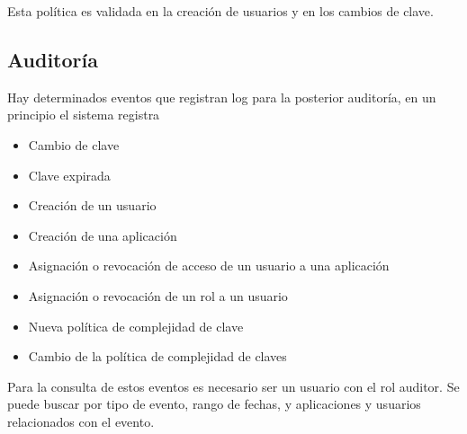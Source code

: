 Esta política es validada en la creación de usuarios y en los cambios de clave. 

\subsection{Auditoría}

Hay determinados eventos que registran log para la posterior auditoría, en un principio el sistema registra

\begin{itemize}
  \item Cambio de clave
  \item Clave expirada
  \item Creación de un usuario
  \item Creación de una aplicación
  \item Asignación o revocación de acceso de un usuario a una aplicación
  \item Asignación o revocación de un rol a un usuario
  \item Nueva política de complejidad de clave
  \item Cambio de la política de complejidad de claves
\end{itemize}

Para la consulta de estos eventos es necesario ser un usuario con el rol auditor.
Se puede buscar por tipo de evento, rango de fechas, y aplicaciones y usuarios relacionados con el evento.